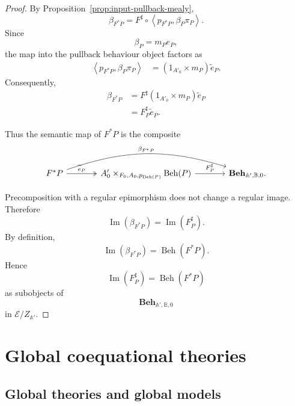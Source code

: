 \begin{proof}
    By
    Proposition~\ref{prop:input-pullback-mealy},
    \[
        \beta_{F^*P}
        =
        F^\sharp
        \circ
        \left\langle
            p_{F^*P},
            \beta_P\pi_P
        \right\rangle.
    \]
    Since
    \[
        \beta_P=m_Pe_P,
    \]
    the map into the pullback behaviour object factors as
    \[
    \begin{aligned}
        \left\langle
            p_{F^*P},
            \beta_P\pi_P
        \right\rangle
        &=
        (1_{A'_0}\times m_P)
        \widetilde e_P.
    \end{aligned}
    \]
    Consequently,
    \[
    \begin{aligned}
        \beta_{F^*P}
        &=
        F^\sharp
        (1_{A'_0}\times m_P)
        \widetilde e_P
        \\
        &=
        F^\sharp_P
        \widetilde e_P.
    \end{aligned}
    \]

    Thus the semantic map of \(F^*P\) is the composite
    \[
    \begin{tikzcd}[column sep=large, row sep=large]
        F^*P
            \arrow[r, two heads, "\widetilde e_P"]
            \arrow[rr, bend left=18, "\beta_{F^*P}"]
        &
        A'_0
        \times_{F_0,A_0,p_{\operatorname{Beh}(P)}}
        \operatorname{Beh}(P)
            \arrow[r, "F^\sharp_P"]
        &
        \mathbf{Beh}_{\mathbb A',\mathbb B,0}.
    \end{tikzcd}
    \]

    Precomposition with a regular epimorphism does not change a regular
    image. Therefore
    \[
        \operatorname{Im}(\beta_{F^*P})
        =
        \operatorname{Im}(F^\sharp_P).
    \]
    By definition,
    \[
        \operatorname{Im}(\beta_{F^*P})
        =
        \operatorname{Beh}(F^*P).
    \]
    Hence
    \[
        \operatorname{Im}(F^\sharp_P)
        =
        \operatorname{Beh}(F^*P)
    \]
    as subobjects of
    \[
        \mathbf{Beh}_{\mathbb A',\mathbb B,0}
    \]
    in \(\mathcal E/Z_{\mathbb A'}\).
\end{proof}

\section{Global coequational theories}
\label{sec:global-coequational-theories}

\subsection{Global theories and global models}
\label{subsec:global-theories-and-models}

